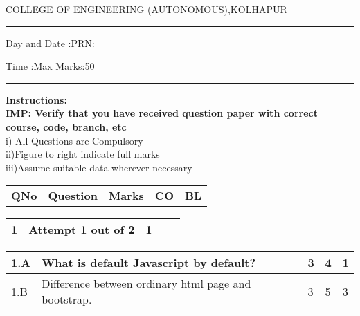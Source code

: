 \documentclass[12pt]{article}
\begin{document}
		\par
	COLLEGE OF ENGINEERING (AUTONOMOUS),KOLHAPUR
	\par\noindent\rule{\textwidth}{0.4pt}
	\centering{}\par
\centering{}\par
{}\par
\begin{flushleft}
	Day and Date :{}\hspace{5.5cm}PRN:
\end{flushleft}

\begin{flushleft}
	Time :{}\hspace{7cm}Max Marks:{50}\\
\end{flushleft}
\noindent\rule{\textwidth}{0.1pt}
\begin{flushleft}
	{\bf Instructions:}\\
	{\hspace{0.5cm} \bf IMP: Verify that you have received question paper with correct course, code, branch, etc}\\
	\hspace{1cm}i) All Questions are Compulsory\\
	\hspace{1cm}ii)Figure to right indicate full marks\\
	\hspace{1cm}iii)Assume suitable data wherever necessary\\
\end{flushleft} 

\begin{tabular}{L{1cm}C{8cm}C{2cm}C{2cm}C{1cm}}
	\bf{QNo} & 
	\bf{Question}
	
	&
	\bf{Marks}&
	\bf{CO}&
	\bf{BL}
	
	
	
\end{tabular}

		\begin{tabular}{L{1cm}L{8cm}C{2cm}C{2cm}C{1cm}}
		\bf1 & Attempt 1 out of 2 & 1 & & \\ \hline
	\end{tabular}

	
	
	\begin{tabular}{|L{1cm}|L{8cm}|C{2cm}|C{2cm}|C{1cm}|}
				1.A &
	What is default Javascript by default? \newline
		 &  3 & 4 & 1\\ \hline
		1.B &
	Difference between ordinary html page and bootstrap. \newline
		 &  3 & 5 & 3\\ \hline
		\end{tabular}
\end{document}
